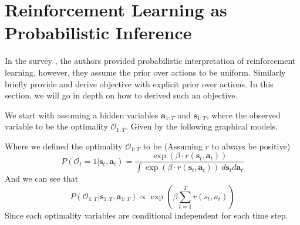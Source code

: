 \section{Reinforcement Learning as Probabilistic Inference}

In the survey \cite{levine2018reinforcement}, the authors provided probabilistic interpretation of reinforcement learning, however, they assume the prior over actions to be uniform. Similarly \cite{grau2018soft} briefly provide and derive objective with explicit prior over actions. In this section, we will go in depth on how to derived such an objective.

We start with assuming a hidden variables $\boldsymbol{a}_{1:T}$ and $\boldsymbol{s}_{1:T}$, where the observed variable to be the optimality $\mathcal{O}_{1:T}$. Given by the following graphical models.

\begin{figure}[!h]
\end{figure}

Where we defined the optimality $\mathcal{O}_{1:T}$ to be (Assuming $r$ to always be positive)
\begin{equation}
    P(\mathcal{O}_{t} = 1 | \boldsymbol{s}_{t}, \boldsymbol{a}_{t}) = \frac{\exp\left(\beta \cdot r(\boldsymbol{s}_{t}, \boldsymbol{a}_{t})\right)}{\int \exp(\beta \cdot r(\boldsymbol{s}_{t}, \boldsymbol{a}_{t})) \ d\boldsymbol{s}_{t} d\boldsymbol{a}_{t}}
\end{equation}
And we can see that 
\begin{equation}
    P(\mathcal{O}_{1:T} | \boldsymbol{s}_{1:T}, \boldsymbol{a}_{1:T}) \propto \exp \left( \beta \sum^T_{t=1} r(s_t, a_t) \right)
\end{equation}
Since each optimality variables are conditional independent for each time step. 

